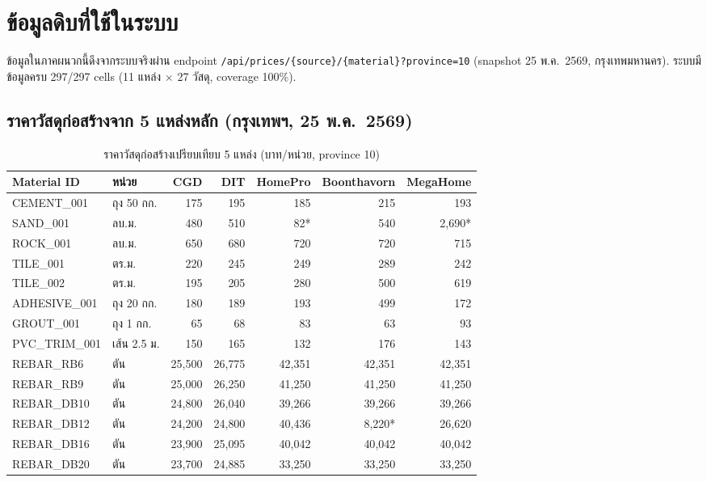 \chapter{ข้อมูลดิบที่ใช้ในระบบ}
\label{app:rawdata}

ข้อมูลในภาคผนวกนี้ดึงจากระบบจริงผ่าน endpoint
\texttt{/api/prices/\{source\}/\{material\}?province=10}
(snapshot 25 พ.ค.\ 2569, กรุงเทพมหานคร). ระบบมีข้อมูลครบ
297/297 cells (11 แหล่ง $\times$ 27 วัสดุ, coverage 100\%).

\section{ราคาวัสดุก่อสร้างจาก 5 แหล่งหลัก (กรุงเทพฯ, 25 พ.ค.\ 2569)}

\begingroup\footnotesize
\begin{longtable}{llrrrrr}
\caption{ราคาวัสดุก่อสร้างเปรียบเทียบ 5 แหล่ง (บาท/หน่วย, province 10)}\\
\toprule
\textbf{Material ID} & \textbf{หน่วย} & \textbf{CGD} & \textbf{DIT} & \textbf{HomePro} & \textbf{Boonthavorn} & \textbf{MegaHome} \\
\midrule
\endhead
CEMENT\_001 & ถุง 50 กก. & 175 & 195 & 185 & 215 & 193 \\
SAND\_001 & ลบ.ม. & 480 & 510 & 82* & 540 & 2{,}690* \\
ROCK\_001 & ลบ.ม. & 650 & 680 & 720 & 720 & 715 \\
TILE\_001 & ตร.ม. & 220 & 245 & 249 & 289 & 242 \\
TILE\_002 & ตร.ม. & 195 & 205 & 280 & 500 & 619 \\
ADHESIVE\_001 & ถุง 20 กก. & 180 & 189 & 193 & 499 & 172 \\
GROUT\_001 & ถุง 1 กก. & 65 & 68 & 83 & 63 & 93 \\
PVC\_TRIM\_001 & เส้น 2.5 ม. & 150 & 165 & 132 & 176 & 143 \\
REBAR\_RB6 & ตัน & 25{,}500 & 26{,}775 & 42{,}351 & 42{,}351 & 42{,}351 \\
REBAR\_RB9 & ตัน & 25{,}000 & 26{,}250 & 41{,}250 & 41{,}250 & 41{,}250 \\
REBAR\_DB10 & ตัน & 24{,}800 & 26{,}040 & 39{,}266 & 39{,}266 & 39{,}266 \\
REBAR\_DB12 & ตัน & 24{,}200 & 24{,}800 & 40{,}436 & 8{,}220* & 26{,}620 \\
REBAR\_DB16 & ตัน & 23{,}900 & 25{,}095 & 40{,}042 & 40{,}042 & 40{,}042 \\
REBAR\_DB20 & ตัน & 23{,}700 & 24{,}885 & 33{,}250 & 33{,}250 & 33{,}250 \\

\end{longtable}
